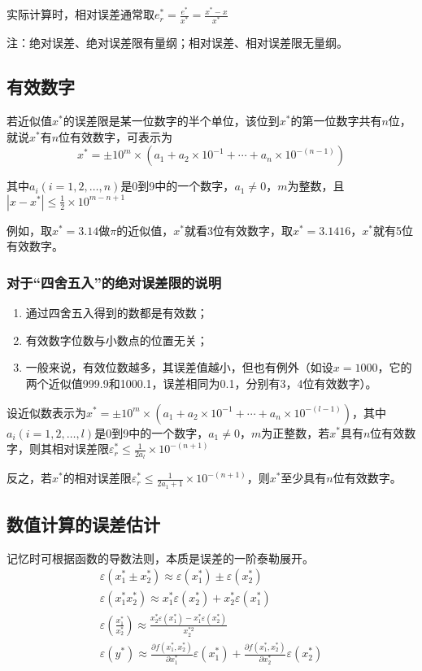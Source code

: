 \documentclass[UTF8,a4paper,11pt,oneside]{ctexbook}
\begin{document}
实际计算时，相对误差通常取\(e_r^*=\frac{e^*}{x^*}=\frac{x^*-x}{x^*}\)

注：绝对误差、绝对误差限有量纲；相对误差、相对误差限无量纲。

\subsection{有效数字}

若近似值\(x^*\)的误差限是某一位数字的半个单位，该位到\(x^*\)的第一位数字共有\(n\)位，就说\(x^*\)有\(n\)位有效数字，可表示为
\[
x^*=\pm10^m\times(a_1+a_2\times10^{-1}+\cdots+a_n\times10^{-(n-1)})
\]

其中\(a_i(i=1,2,\ldots,n)\)是0到9中的一个数字，\(a_1\neq0\)，\(m\)为整数，且\(|x-x^*|\leq\frac{1}{2}\times10^{m-n+1}\)

例如，取\(x^*=3.14\)做\(\pi\)的近似值，\(x^*\)就看3位有效数字，取\(x^*=3.1416\)，\(x^*\)就有5位有效数字。

\subsubsection{对于“四舍五入”的绝对误差限的说明}
\begin{enumerate}
    \item 通过四舍五入得到的数都是有效数；
    \item 有效数字位数与小数点的位置无关；
    \item 一般来说，有效位数越多，其误差值越小，但也有例外（如设\(x=1000\)，它的两个近似值999.9和1000.1，误差相同为0.1，分别有3，4位有效数字）。
\end{enumerate}

设近似数表示为\(x^*=\pm10^m\times(a_1+a_2\times10^{-1}+\cdots+a_n\times10^{-(l-1)})\)，其中\(a_i(i=1,2,\ldots,l)\)是0到9中的一个数字，\(a_1\neq0\)，\(m\)为正整数，若\(x^*\)具有\(n\)位有效数字，则其相对误差限\(\varepsilon_r^*\leq\frac{1}{2a_l}\times10^{-(n+1)}\)

反之，若\(x^*\)的相对误差限\(\varepsilon_r^*\leq\frac{1}{2a_1+1}\times10^{-(n+1)}\)，则\(x^*\)至少具有\(n\)位有效数字。

\subsection{数值计算的误差估计}

记忆时可根据函数的导数法则，本质是误差的一阶泰勒展开。
\begin{gather*}
    \varepsilon(x_1^*\pm x_2^*)\approx\varepsilon(x_1^*)\pm\varepsilon(x_2^*)\\
    \varepsilon(x_1^*x_2^*)\approx x_1^*\varepsilon(x_2^*)+x_2^*\varepsilon(x_1^*)\\
    \varepsilon\left(\frac{x_1^*}{x_2^*}\right)\approx\frac{x_2^*\varepsilon(x_1^*)-x_1^*\varepsilon(x_2^*)}{x_2^{*2}}\\
    \varepsilon(y^*)\approx\frac{\partial f(x_1^*,x_2^*)}{\partial x_1^*}\varepsilon(x_1^*)+\frac{\partial f(x_1^*,x_2^*)}{\partial x_2^*}\varepsilon(x_2^*)
\end{gather*}
\end{document}

